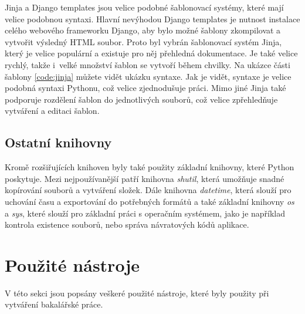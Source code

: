 \documentclass[thesis=B,czech]{resources/FITthesis}[2012/06/26]
\begin{document}
Jinja a Django templates jsou velice podobné šablonovací systémy, které mají velice podobnou syntaxi. Hlavní nevýhodou Django templates je nutnost instalace celého webového frameworku Django, aby bylo možné šablony zkompilovat a vytvořit výsledný HTML soubor. Proto byl vybrán šablonovací systém Jinja, který je velice populární a existuje pro něj přehledná dokumentace. Je také velice rychlý, takže i~velké množství šablon se vytvoří během chvilky. Na ukázce části šablony \ref{code:jinja} můžete vidět ukázku syntaxe. Jak je vidět, syntaxe je velice podobná syntaxi Pythonu, což velice zjednodušuje práci. Mimo jiné Jinja také podporuje rozdělení šablon do jednotlivých souborů, což velice zpřehledňuje vytváření a editaci šablon.

\subsection{Ostatní knihovny}
Kromě rozšiřujících knihoven byly také použity základní knihovny, které Python poskytuje. Mezi nejpoužívanější patří knihovna \textit{shutil}, která umožňuje snadné kopírování souborů a vytváření složek. Dále knihovna \textit{datetime}, která slouží pro uchování času a exportování do potřebných formátů a také základní knihovny \textit{os} a \textit{sys}, které slouží pro základní práci s operačním systémem, jako je například kontrola existence souborů, nebo správa návratových kódů aplikace.



\section{Použité nástroje}
V této sekci jsou popsány veškeré použité nástroje, které byly použity při vytváření bakalářské práce.
\end{document}
